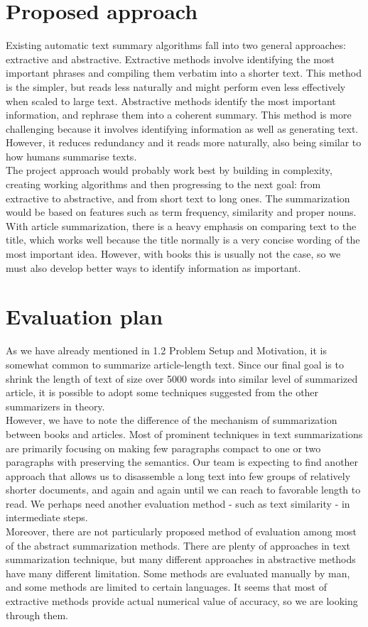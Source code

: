 \section{Proposed approach}

Existing automatic text summary algorithms fall into two general approaches: extractive and abstractive. Extractive methods involve identifying the most important phrases and compiling them verbatim into a shorter text. This method is the simpler, but reads less naturally and might perform even less effectively when scaled to large text. Abstractive methods identify the most important information, and rephrase them into a coherent summary. This method is more challenging because it involves identifying information as well as generating text. However, it reduces redundancy and it reads more naturally, also being similar to how humans summarise texts. \cite{Gaikwad2016} \\
The project approach would probably work best by building in complexity, creating working algorithms and then progressing to the next goal: from extractive to abstractive, and from short text to long ones. The summarization would be based on features such as term frequency, similarity and proper nouns. With article summarization, there is a heavy emphasis on comparing text to the title, which works well because the title normally is a very concise wording of the most important idea. However, with books this is usually not the case, so we must also develop better ways to identify information as important.

\section{Evaluation plan}

As we have already mentioned in 1.2 Problem Setup and Motivation, it is somewhat common to summarize article-length text. Since our final goal is to shrink the length of text of size over 5000 words into similar level of summarized article, it is possible to adopt some techniques suggested from the other summarizers in theory. \\
However, we have to note the difference of the mechanism of summarization between books and articles. Most of prominent techniques in text summarizations are primarily focusing on making few paragraphs compact to one or two paragraphs with preserving the semantics. Our team is expecting to find another approach that allows us to disassemble a long text into few groups of relatively shorter documents, and again and again until we can reach to favorable length to read. We perhaps need another evaluation method - such as text similarity \cite{Do2010RobustLA} - in intermediate steps. \\
Moreover, there are not particularly proposed method of evaluation among most of the abstract summarization methods. There are plenty of approaches in text summarization technique, but many different approaches in abstractive methods have many different limitation. Some methods are evaluated manually by man, and some methods are limited to certain languages. It seems that most of extractive methods provide actual numerical value of accuracy, so we are looking through them.

